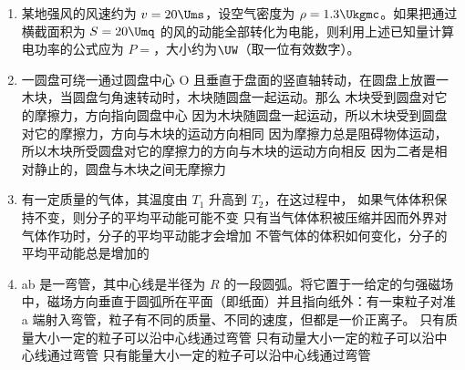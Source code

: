 \documentclass[\gkver]{gaokaozhenti}
\begin{document}
\begin{enumerate}
\item
某地强风的风速约为 $v=20\Ums$，设空气密度为 $\rho=1.3\Ukgmc$。如果把通过横截面积为 $S=20\Umq$ 的风的动能全部转化为电能，则利用上述已知量计算电功率的公式应为 $P=$，大小约为$\UW$（取一位有效数字）。



\item
一圆盘可绕一通过圆盘中心 O 且垂直于盘面的竖直轴转动，在圆盘上放置一木块，当圆盘匀角速转动时，木块随圆盘一起运动。那么
{木块受到圆盘对它的摩擦力，方向指向圆盘中心}
{因为木块随圆盘一起运动，所以木块受到圆盘对它的摩擦力，方向与木块的运动方向相同}
{因为摩擦力总是阻碍物体运动，所以木块所受圆盘对它的摩擦力的方向与木块的运动方向相反}
{因为二者是相对静止的，圆盘与木块之间无摩擦力}


\item
有一定质量的气体，其温度由 $T_{1}$ 升高到 $T_{2}$，在这过程中，
{如果气体体积保持不变，则分子的平均平动能可能不变}
{只有当气体体积被压缩并因而外界对气体作功时，分子的平均平动能才会增加}
{不管气体的体积如何变化，分子的平均平动能总是增加的}


\item
ab 是一弯管，其中心线是半径为 $R$ 的一段圆弧。将它置于一给定的匀强磁场中，磁场方向垂直于圆弧所在平面（即纸面）并且指向纸外：有一束粒子对准 a 端射入弯管，粒子有不同的质量、不同的速度，但都是一价正离子。
{只有质量大小一定的粒子可以沿中心线通过弯管}
{只有动量大小一定的粒子可以沿中心线通过弯管}
{只有能量大小一定的粒子可以沿中心线通过弯管}


\end{enumerate}
\end{document}
